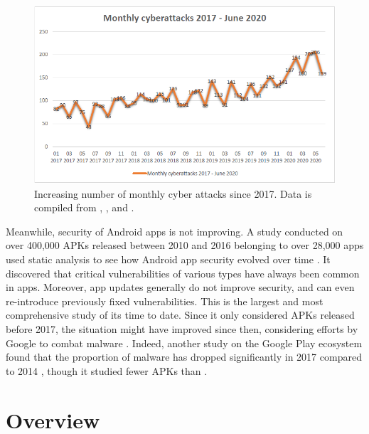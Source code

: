 		\begin{figure}[h]
            \centering
            \includegraphics[width=1\textwidth]{graphics/threatscape_chart.PNG}
            \caption{Increasing number of monthly cyber attacks since 2017. Data is compiled from \cite{pt_threatscape_2018}, \cite{pt_threatscape_2019}, \cite{pt_threatscape_2020} and              \cite{pt_threatscape_2020q2}.}
            \label{fig:no_attacks_evolution}
        \end{figure}
		
        Meanwhile, security of Android apps is not improving. A study conducted on over 400,000 APKs released between 2010 and 2016 belonging to over 28,000 apps used static analysis to see how Android app security evolved over time \cite{android_vulnerabilities_evolution}. It discovered that critical vulnerabilities of various types have always been common in apps. Moreover, app updates generally do not improve security, and can even re-introduce previously fixed vulnerabilities. This is the largest and most comprehensive study of its time to date. Since it only considered APKs released before 2017, the situation might have improved since then, considering efforts by Google to combat malware \cite{google_blog_improve_security}. Indeed, another study on the Google Play ecosystem found that the proportion of malware has dropped significantly in 2017 compared to 2014 \cite{newer_android_vulnerabilities_evolution}, though it studied fewer APKs than \cite{android_vulnerabilities_evolution}.
        
    \section{Overview}  
		\label{sec:intro_overview} 
		
